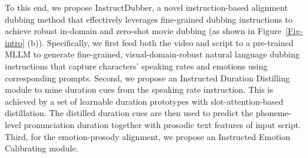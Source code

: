 To this end, we propose InstructDubber, a novel instruction-based alignment dubbing method that effectively leverages fine-grained dubbing instructions to achieve robust in-domain and zero-shot movie dubbing (as shown in Figure~\ref{Fig-intro} (b)).
Specifically, we first feed both the video and script to a pre-trained MLLM to generate fine-grained, visual-domain-robust natural language dubbing instructions that capture characters' speaking rates and emotions using corresponding prompts.
Second, we propose an Instructed Duration Distilling module to mine duration cues from the speaking rate instruction. 
This is achieved by a set of learnable duration prototypes with slot-attention-based distillation.
The distilled duration cues are then used to predict the phoneme-level pronunciation duration together with prosodic text features of input script.
Third, for the emotion-prosody alignment, we propose an Instructed Emotion Calibrating module.
